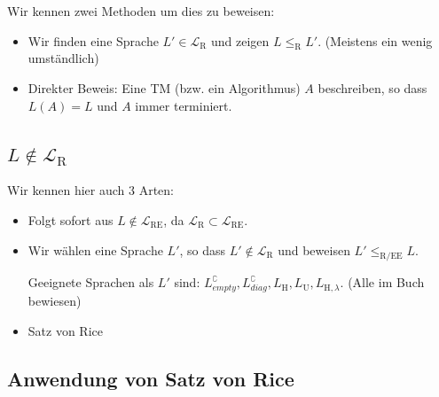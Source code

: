 \documentclass[a4paper, 11pt]{article}
\def\L{\mathcal{L}}
\def\Lr{\mathcal{L}_\text{R}}
\begin{document}
                    Wir kennen zwei Methoden um dies zu beweisen:
                    \begin{itemize}[label=-]
                        \item Wir finden eine Sprache $L' \in \L_\text{R}$ und zeigen $L \leq_{\text{R}} L'$. (Meistens ein wenig umständlich)
                        \item Direkter Beweis:  Eine TM (bzw. ein Algorithmus) $A$ beschreiben, so dass $L(A) = L$ und $A$ immer terminiert.
                    \end{itemize}
            
            
            
                \subsection{$L \notin \Lr$}

                    Wir kennen hier auch 3 Arten:
                    \begin{itemize}[label=-]
                        \item Folgt sofort aus $L \notin \L_{\text{RE}}$, da $\L_{\text{R}} \subset \L_{\text{RE}}$.
                        \item Wir wählen eine Sprache $L'$, so dass $L' \notin \L_{\text{R}}$ und beweisen $L' \leq_{\text{R/EE}} L$.
                        
                            Geeignete Sprachen als $L'$ sind: $L_{empty}^\complement, L_{diag}^\complement, L_\text{H}, L_\text{U}, L_{\text{H}, \lambda}$. (Alle im Buch bewiesen)
                        \item Satz von Rice 
                    \end{itemize}
            
            
            \subsection{Anwendung von Satz von Rice}
\end{document}
